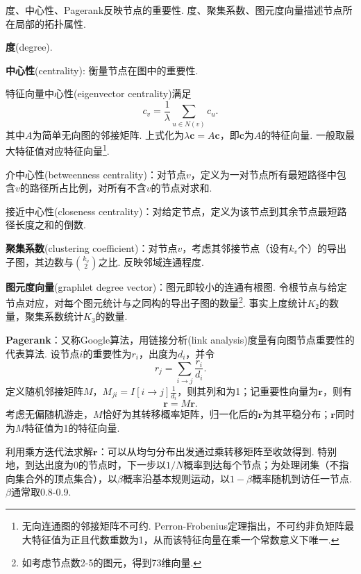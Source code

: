 度、中心性、Pagerank反映节点的重要性. 度、聚集系数、图元度向量描述节点所在局部的拓扑属性. 

\par \textbf{度}(degree).

\par \textbf{中心性}(centrality): 衡量节点在图中的重要性. 
\par 特征向量中心性(eigenvector centrality)满足
\begin{equation}
    c_v=\frac{1}{\lambda}\sum_{u\in N(v)} c_u.
\end{equation}
其中$A$为简单无向图的邻接矩阵. 上式化为$\lambda \mathbf{c}=A\mathbf{c}$，即$\mathbf{c}$为$A$的特征向量. 一般取最大特征值对应特征向量\footnote{无向连通图的邻接矩阵不可约. Perron-Frobenius定理指出，不可约非负矩阵最大特征值为正且代数重数为1，从而该特征向量在乘一个常数意义下唯一. }. 
\par 介中心性(betweenness centrality)：对节点$v$，定义为一对节点所有最短路径中包含$v$的路径所占比例，对所有不含$v$的节点对求和. 
\par 接近中心性(closeness centrality)：对给定节点，定义为该节点到其余节点最短路径长度之和的倒数. 

\par \textbf{聚集系数}(clustering coefficient)：对节点$v$，考虑其邻接节点（设有$k_v$个）的导出子图，其边数与$\binom{k_v}{2}$之比. 反映邻域连通程度. 

\par \textbf{图元度向量}(graphlet degree vector)：图元即较小的连通有根图. 令根节点与给定节点对应，对每个图元统计与之同构的导出子图的数量\footnote{如考虑节点数2-5的图元，得到73维向量. }. 事实上度统计$K_2$的数量，聚集系数统计$K_3$的数量. 

\par \textbf{Pagerank}：又称Google算法，用链接分析(link analysis)度量有向图节点重要性的代表算法. 设节点$i$的重要性为$r_i$，出度为$d_i$，并令
\begin{equation}
    r_j=\sum_{i\to j}\frac{r_i}{d_i}.
\end{equation}
定义随机邻接矩阵$M$，$M_{ji}=I[i\to j] \frac{1}{d_i}$，则其列和为1；记重要性向量为$\mathbf{r}$，则有
\begin{equation}
    \mathbf{r}=M\mathbf{r}.
\end{equation}
考虑无偏随机游走，$M$恰好为其转移概率矩阵，归一化后的$\mathbf{r}$为其平稳分布；$\mathbf{r}$同时为$M$特征值为1的特征向量. 
\par 利用乘方迭代法求解$\mathbf{r}$：可以从均匀分布出发通过乘转移矩阵至收敛得到. 特别地，到达出度为0的节点时，下一步以$1/N$概率到达每个节点；为处理闭集（不指向集合外的顶点集合），以$\beta$概率沿基本规则运动，以$1-\beta$概率随机到访任一节点. $\beta$通常取0.8-0.9. 

